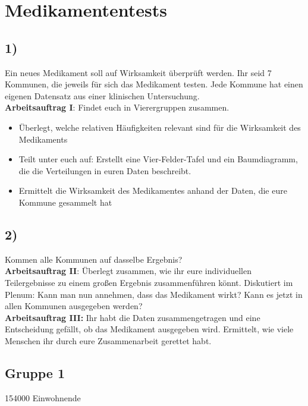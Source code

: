 \documentclass[]{article}
\begin{document}
\section*{Medikamententests}

\subsection*{1)}
Ein neues Medikament soll auf Wirksamkeit überprüft werden. Ihr seid 7 Kommunen, die jeweils für sich das Medikament testen. Jede Kommune hat einen eigenen Datensatz aus einer klinischen Untersuchung.\\

\textbf{Arbeitsauftrag I}: Findet euch in Vierergruppen zusammen.
\begin{itemize}
	\item Überlegt, welche relativen Häufigkeiten relevant sind für die Wirksamkeit des Medikaments
	\item Teilt unter euch auf: Erstellt eine Vier-Felder-Tafel und ein Baumdiagramm, die die Verteilungen in euren Daten beschreibt.
	\item Ermittelt die Wirksamkeit des Medikamentes anhand der Daten, die eure Kommune gesammelt hat
\end{itemize} 

\subsection*{2)}
Kommen alle Kommunen auf dasselbe Ergebnis?\\

\textbf{Arbeitsauftrag II}: Überlegt zusammen, wie ihr eure individuellen Teilergebnisse zu einem großen Ergebnis zusammenführen könnt. Diskutiert im Plenum: Kann man nun annehmen, dass das Medikament wirkt? Kann es jetzt in allen Kommunen ausgegeben werden?\\

\textbf{Arbeitsauftrag III:} Ihr habt die Daten zusammengetragen und eine Entscheidung gefällt, ob das Medikament ausgegeben wird. Ermittelt, wie viele Menschen ihr durch eure Zusammenarbeit gerettet habt.

\newpage

\subsection*{Gruppe 1}

154000 Einwohnende\\
\end{document}
